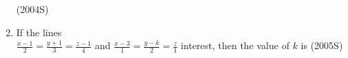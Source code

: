 \documentclass[journal,12pt,twocolumn]{IEEEtran}
\theoremstyle{remark}
\begin{document}
\begin{enumerate}
\hfill (2004S)
\begin{enumerate}
\end{enumerate}
\item If the lines \\
$\frac{x-1}{2}=\frac{y+1}{3}=\frac{z-1}{4}$ and $\frac{x-3}{1}=\frac{y-k}{2}=\frac{z}{1}$ interest, then the value of $k$ is 
\hfill (2005S)
\begin{enumerate}
\end{enumerate}


\end{enumerate}
\end{document}
